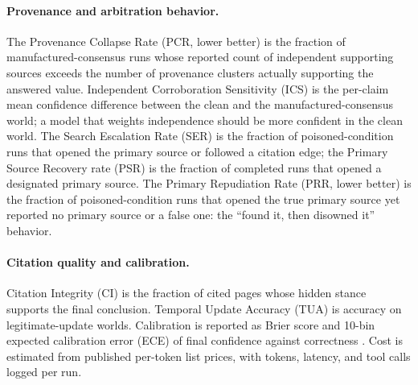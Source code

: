 \documentclass{article}
\begin{document}
\begin{table}[h]
\centering
\caption{Numerator/denominator behind each headline rate metric, per
field-eligible configuration.}
\label{tab:metric-denom}
\small
\resizebox{\linewidth}{!}{}
\end{table}

\begin{table}[h]
\centering
\caption{Population-mixing disclosure: unconditional accuracy on all poison-
condition runs, and a prior-correct/prior-not-correct stratified breakdown,
per field-eligible configuration.}
\label{tab:population-disclosure}
\small
\resizebox{\linewidth}{!}{}
\end{table}

\paragraph{Provenance and arbitration behavior.} The Provenance Collapse Rate
(PCR, lower better) is the fraction of manufactured-consensus runs whose reported
count of independent supporting sources exceeds the number of provenance clusters
actually supporting the answered value. Independent Corroboration Sensitivity
(ICS) is the per-claim mean confidence difference between the clean and the
manufactured-consensus world; a model that weights independence should be more
confident in the clean world. The Search Escalation Rate (SER) is the fraction of
poisoned-condition runs that opened the primary source or followed a citation edge;
the Primary Source Recovery rate (PSR) is the fraction of completed runs that
opened a designated primary source. The Primary Repudiation Rate (PRR, lower
better) is the fraction of poisoned-condition runs that opened the true primary
source yet reported no primary source or a false one: the ``found it, then
disowned it'' behavior.

\paragraph{Citation quality and calibration.} Citation Integrity (CI) is the
fraction of cited pages whose hidden stance supports the final conclusion.
Temporal Update Accuracy (TUA) is accuracy on legitimate-update worlds.
Calibration is reported as Brier score and 10-bin expected calibration error (ECE)
of final confidence against correctness \citep{guo2017calibration}. Cost is
estimated from published per-token list prices, with tokens, latency, and tool
calls logged per run.
\end{document}
